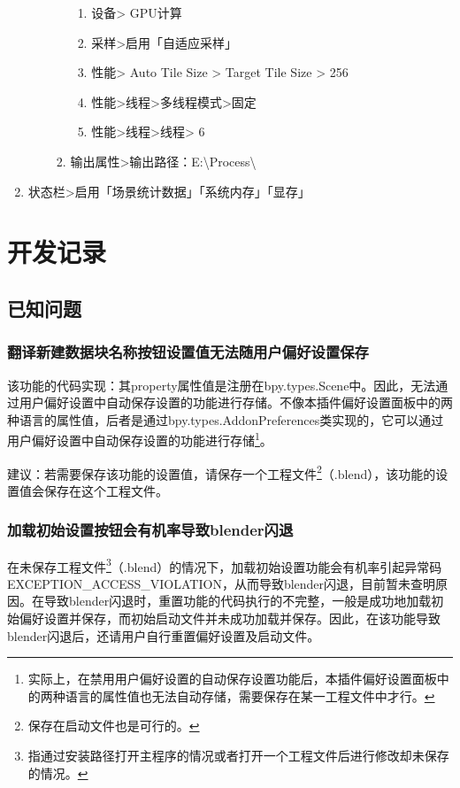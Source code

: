 \documentclass{../../PublicResources/DocClass}
\begin{document}
\begin{enumerate}
\begin{enumerate}
\begin{enumerate}
\begin{enumerate}
                \item 设备> GPU计算
                \item 采样>启用「自适应采样」
                \item 性能> Auto Tile Size > Target Tile Size > 256
                \item 性能>线程>多线程模式>固定
                \item 性能>线程>线程> 6
            \end{enumerate}
            \item 输出属性>输出路径：E:\textbackslash Process\textbackslash
        \end{enumerate}
    \end{enumerate}
    \item 状态栏>启用「场景统计数据」「系统内存」「显存」
\end{enumerate}

\section{开发记录}
\subsection{已知问题}
\subsubsection{翻译新建数据块名称按钮设置值无法随用户偏好设置保存}
该功能的代码实现：其property属性值是注册在bpy.types.Scene中。因此，无法通过用户偏好设置中自动保存设置的功能进行存储。不像本插件偏好设置面板中的两种语言的属性值，后者是通过bpy.types.AddonPreferences类实现的，它可以通过用户偏好设置中自动保存设置的功能进行存储\footnote{实际上，在禁用用户偏好设置的自动保存设置功能后，本插件偏好设置面板中的两种语言的属性值也无法自动存储，需要保存在某一工程文件中才行。}。

建议：若需要保存该功能的设置值，请保存一个工程文件\footnote{保存在启动文件也是可行的。}（.blend），该功能的设置值会保存在这个工程文件。

\subsubsection{加载初始设置按钮会有机率导致blender闪退}
在未保存工程文件\footnote{指通过安装路径打开主程序的情况或者打开一个工程文件后进行修改却未保存的情况。}（.blend）的情况下，加载初始设置功能会有机率引起异常码EXCEPTION\_ACCESS\_VIOLATION，从而导致blender闪退，目前暂未查明原因。在导致blender闪退时，重置功能的代码执行的不完整，一般是成功地加载初始偏好设置并保存，而初始启动文件并未成功加载并保存。因此，在该功能导致blender闪退后，还请用户自行重置偏好设置及启动文件。
\end{document}
